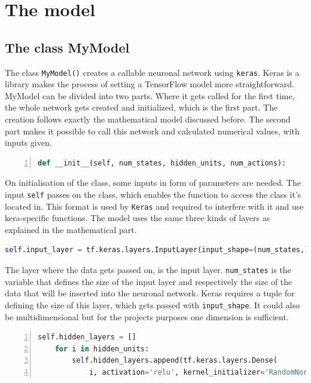 \documentclass[12pt]{article}
\begin{document}
\section{The model}\label{sec:TheModel}
\subsection{The class MyModel}\label{mymodel}
The class \lstinline{MyModel()} creates a callable neuronal network using \lstinline{keras}. Keras is a library makes the process of setting a TensorFlow model more straightforward. MyModel can be divided into two parts. Where it gets called for the first time, the whole network gets created and initialized, which is the first part. The creation follows exactly the mathematical model discussed before. The second part makes it possible to call this network and calculated numerical values, with inputs given.
\lstset{ numbers=left, stepnumber=1,      firstnumber=1,  numberfirstline=true}
\begin{lstlisting}[language=Python,numbers=left, caption=Example - Creation of a neuronal network using Keras.]
def __init__(self, num_states, hidden_units, num_actions):
\end{lstlisting}
On initialisation of the class, some inputs in form of parameters are needed. The input \lstinline{self} passes on the class, which enables the function to access the class it's located in. This format is used by \lstinline{Keras} and required to interfere with it and use kera-specific functions. The model uses the same three kinds of layers as explained in the mathematical part.
\lstset{ numbers=left, stepnumber=1,      firstnumber=2,  numberfirstline=true}
\begin{lstlisting}[language=Python]
    self.input_layer = tf.keras.layers.InputLayer(input_shape=(num_states,))
\end{lstlisting}
The layer where the data gets passed on, is the input layer. \lstinline{num_states} is the variable that defines the size of the input layer and respectively the size of the data that will be inserted into the neuronal network. Keras requires a tuple for defining the size of this layer, which gets passed with \lstinline{input_shape}. It could also be multidimensional but for the projects purposes one dimension is sufficient.
\lstset{ numbers=left, stepnumber=1,      firstnumber=4,  numberfirstline=true}
\begin{lstlisting}[language=Python,numbers=left]
    self.hidden_layers = []
    for i in hidden_units: 
        self.hidden_layers.append(tf.keras.layers.Dense( 
            i, activation='relu', kernel_initializer='RandomNormal')) 
\end{lstlisting}
\end{document}
